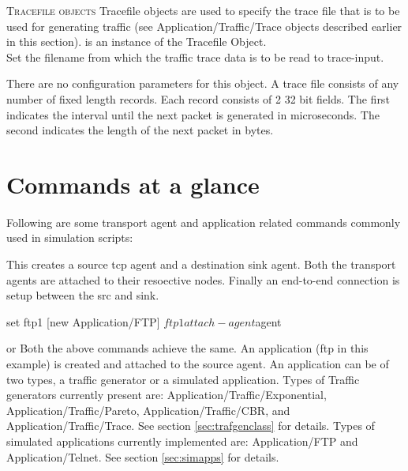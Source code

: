 \textsc{Tracefile objects}
Tracefile objects are used to specify the trace file that is to be used
for generating traffic (see Application/Traffic/Trace objects
described earlier in this section).  is an instance of
the Tracefile Object. 
\\
Set the filename from which the traffic trace data is to be read to
trace-input. 

There are no configuration parameters for this object. A trace file
consists of any number of fixed length records. Each record consists of 2
32 bit fields. The first indicates the interval until the next packet is
generated in microseconds. The second indicates the length of the next
packet in bytes. 



\section{Commands at a glance}
\label{sec:appscommand}

Following are some transport agent and application related commands
commonly used in simulation scripts:
\begin{flushleft}
This creates a source tcp agent and a destination sink agent. Both the transport
agents are attached to their resoective nodes. Finally an end-to-end connection
is setup between the src and sink.


\begin{program}
set ftp1 [new Application/FTP]
$ftp1 attach-agent $agent
\end{program}
or
Both the above commands achieve the same. An application (ftp in this example)
is created and attached to the source agent. An application can be of two
types, a traffic generator or a simulated application.
Types of Traffic generators currently present are: 
Application/Traffic/Exponential, Application/Traffic/Pareto,
Application/Traffic/CBR, and Application/Traffic/Trace. See section \ref{sec:trafgenclass}
for details.
Types of simulated applications currently implemented are:
Application/FTP and Application/Telnet. See  section \ref{sec:simapps} for
details.

\end{flushleft}

\endinput
